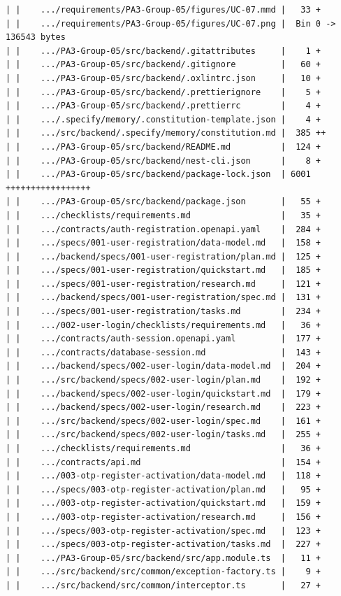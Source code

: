 \documentclass[12pt]{article}
\begin{document}
\begin{lstlisting}[numbers=none,breaklines=true]
| |    .../requirements/PA3-Group-05/figures/UC-07.mmd |   33 +
| |    .../requirements/PA3-Group-05/figures/UC-07.png |  Bin 0 -> 136543 bytes
| |    .../PA3-Group-05/src/backend/.gitattributes     |    1 +
| |    .../PA3-Group-05/src/backend/.gitignore         |   60 +
| |    .../PA3-Group-05/src/backend/.oxlintrc.json     |   10 +
| |    .../PA3-Group-05/src/backend/.prettierignore    |    5 +
| |    .../PA3-Group-05/src/backend/.prettierrc        |    4 +
| |    .../.specify/memory/.constitution-template.json |    4 +
| |    .../src/backend/.specify/memory/constitution.md |  385 ++
| |    .../PA3-Group-05/src/backend/README.md          |  124 +
| |    .../PA3-Group-05/src/backend/nest-cli.json      |    8 +
| |    .../PA3-Group-05/src/backend/package-lock.json  | 6001 +++++++++++++++++
| |    .../PA3-Group-05/src/backend/package.json       |   55 +
| |    .../checklists/requirements.md                  |   35 +
| |    .../contracts/auth-registration.openapi.yaml    |  284 +
| |    .../specs/001-user-registration/data-model.md   |  158 +
| |    .../backend/specs/001-user-registration/plan.md |  125 +
| |    .../specs/001-user-registration/quickstart.md   |  185 +
| |    .../specs/001-user-registration/research.md     |  121 +
| |    .../backend/specs/001-user-registration/spec.md |  131 +
| |    .../specs/001-user-registration/tasks.md        |  234 +
| |    .../002-user-login/checklists/requirements.md   |   36 +
| |    .../contracts/auth-session.openapi.yaml         |  177 +
| |    .../contracts/database-session.md               |  143 +
| |    .../backend/specs/002-user-login/data-model.md  |  204 +
| |    .../src/backend/specs/002-user-login/plan.md    |  192 +
| |    .../backend/specs/002-user-login/quickstart.md  |  179 +
| |    .../backend/specs/002-user-login/research.md    |  223 +
| |    .../src/backend/specs/002-user-login/spec.md    |  161 +
| |    .../src/backend/specs/002-user-login/tasks.md   |  255 +
| |    .../checklists/requirements.md                  |   36 +
| |    .../contracts/api.md                            |  154 +
| |    .../003-otp-register-activation/data-model.md   |  118 +
| |    .../specs/003-otp-register-activation/plan.md   |   95 +
| |    .../003-otp-register-activation/quickstart.md   |  159 +
| |    .../003-otp-register-activation/research.md     |  156 +
| |    .../specs/003-otp-register-activation/spec.md   |  123 +
| |    .../specs/003-otp-register-activation/tasks.md  |  227 +
| |    .../PA3-Group-05/src/backend/src/app.module.ts  |   11 +
| |    .../src/backend/src/common/exception-factory.ts |    9 +
| |    .../src/backend/src/common/interceptor.ts       |   27 +

\end{lstlisting}
\end{document}
